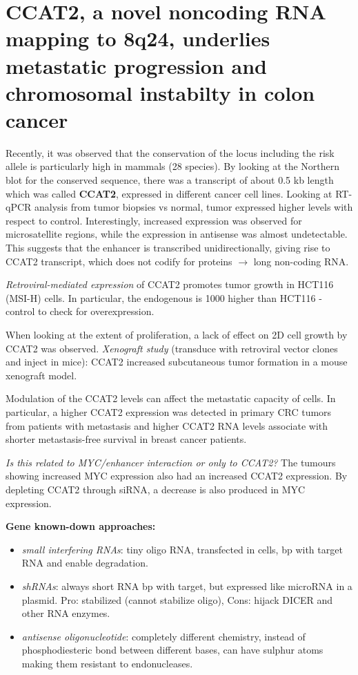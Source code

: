 \section{CCAT2, a novel noncoding RNA mapping to 8q24, underlies metastatic progression and chromosomal instabilty in colon cancer}

Recently, it was observed that the conservation of the locus including the risk allele is particularly high in mammals (28 species). By looking at the Northern blot for the conserved sequence, there was a transcript of about 0.5 kb length which was called \textbf{CCAT2}, expressed in different cancer cell lines. Looking at RT-qPCR analysis from tumor biopsies vs normal, tumor expressed higher levels with respect to control. Interestingly, increased expression was observed for microsatellite regions, while the expression in antisense was almost undetectable. This suggests that the enhancer is transcribed unidirectionally, giving rise to CCAT2 transcript, which does not codify for proteins $\rightarrow$ long non-coding RNA.

\emph{Retroviral-mediated expression} of CCAT2 promotes tumor growth in HCT116 (MSI-H) cells. In particular, the endogenous is 1000 higher than HCT116 - control to check for overexpression.

When looking at the extent of proliferation, a lack of effect on 2D cell growth by CCAT2 was observed. \emph{Xenograft study} (transduce with retroviral vector clones and inject in mice): CCAT2 increased subcutaneous tumor formation in a mouse xenograft model.

Modulation of the CCAT2 levels can affect the metastatic capacity of cells. In particular, a higher CCAT2 expression was detected in primary CRC tumors from patients with metastasis and higher CCAT2 RNA levels associate with shorter metastasis-free survival in breast cancer patients.

\emph{Is this related to MYC/enhancer interaction or only to CCAT2?} The tumours showing increased MYC expression also had an increased CCAT2 expression. By depleting CCAT2 through siRNA, a decrease is also produced in MYC expression.

\textbf{Gene known-down approaches:}

\begin{itemize}
\tightlist
\item
  \emph{small interfering RNAs}: tiny oligo RNA, transfected in cells, bp with target RNA and enable degradation.
\item
  \emph{shRNAs}: always short RNA bp with target, but expressed like microRNA in a plasmid. Pro: stabilized (cannot stabilize oligo), Cons: hijack DICER and other RNA enzymes.
\item
  \emph{antisense oligonucleotide}: completely different chemistry, instead of phosphodiesteric bond between different bases, can have sulphur atoms making them resistant to endonucleases.
\end{itemize}

